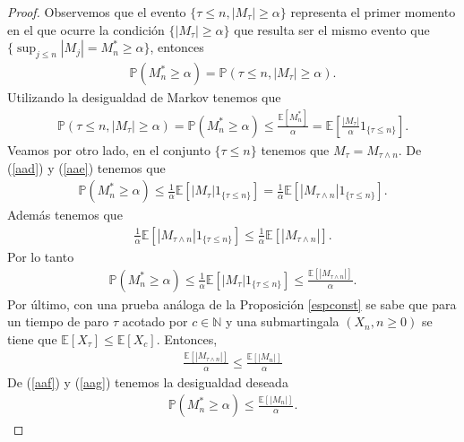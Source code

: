 \begin{proof}
	Observemos que el evento $\{ \tau \leq n, |M_{\tau}| \geq \alpha\}$ representa el primer momento en el que ocurre la condición $\{|M_{\tau}| \geq \alpha\}$ que resulta ser el mismo evento que $\{\sup_{j \leq n} |M_j| = M_n^{*} \geq \alpha\}$, entonces
	\begin{align}
		\mathbb{P}(M_n^{*} \geq \alpha) = \mathbb{P}(\tau \leq n, |M_{\tau}| \geq \alpha). \label{aad}
	\end{align}
Utilizando la desigualdad de Markov tenemos que 
	\begin{align}
		\mathbb{P}(\tau \leq n, |M_{\tau}| \geq \alpha) = \mathbb{P}(M_n^{*} \geq \alpha)  \leq \frac{\mathbb{E}[M_n^{*}]}{\alpha} = \mathbb{E} \left[\frac{|M_{\tau}|}{\alpha}  1_{\{\tau \leq n\}} \right]. \label{aae}
	\end{align}
Veamos por otro lado, en el conjunto $\{ \tau \leq n\}$ tenemos que $M_{\tau} = M_{\tau \wedge n}$. De (\ref{aad}) y (\ref{aae}) tenemos que
	\begin{align*}
		\mathbb{P}(M_n^{*} \geq \alpha) \leq \frac{1}{\alpha} \mathbb{E}[|M_{\tau}|  1_{\{\tau \leq n\}}] = \frac{1}{\alpha} \mathbb{E}[|M_{\tau \wedge n}|  1_{\{\tau \leq n\}}].
	\end{align*}
Además tenemos que 
	\begin{align*}
		\frac{1}{\alpha} \mathbb{E}[|M_{\tau \wedge n}|  1_{\{\tau \leq n\}}] \leq \frac{1}{\alpha} \mathbb{E}[|M_{\tau \wedge n}|].
	\end{align*}
Por lo tanto
	\begin{align}
		\mathbb{P}(M_n^{*} \geq \alpha) \leq \frac{1}{\alpha} \mathbb{E}[|M_{\tau}|  1_{\{\tau \leq n\}}] \leq \frac{\mathbb{E}[|M_{\tau \wedge n}|]}{\alpha}. \label{aaf}
	\end{align}
	Por último, con una prueba análoga de la Proposición \ref{espconst} se sabe que para un tiempo de paro $\tau$ acotado por $c \in \mathbb{N}$ y una submartingala $(X_n, n \geq 0)$ se tiene que $\mathbb{E}[X_{\tau}] \leq \mathbb{E}[X_{c}]$. Entonces, 
	\begin{align}
		\frac{\mathbb{E}[|M_{\tau \wedge n}|]}{\alpha} \leq \frac{\mathbb{E}[|M_{n}|]}{\alpha} \label{aag}
	\end{align}
	De (\ref{aaf}) y (\ref{aag}) tenemos la desigualdad deseada
	\begin{align*}
		\mathbb{P}(M_n^{*} \geq \alpha) \leq \frac{\mathbb{E}[|M_{n}|]}{\alpha}.
	\end{align*}
\end{proof}

